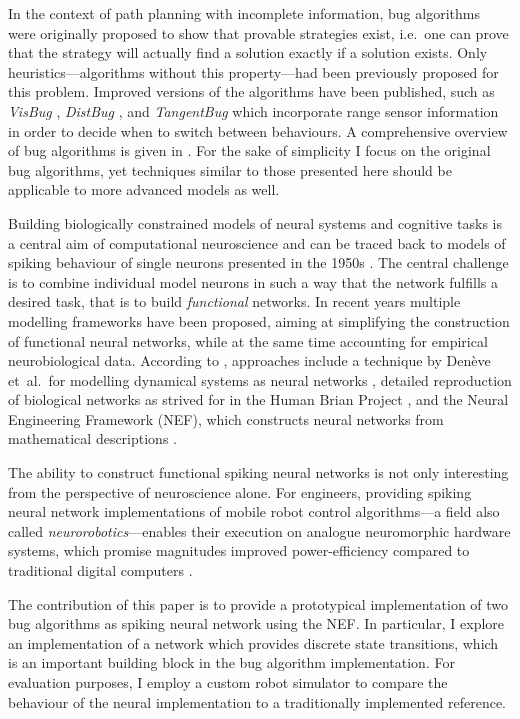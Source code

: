 \documentclass[letterpaper,10pt,conference]{ieeeconf}
\begin{document}
In the context of path planning with incomplete information, bug algorithms were originally proposed to show that provable strategies exist, i.e.~one can prove that the strategy will actually find a solution exactly if a solution exists. Only heuristics---algorithms without this property---had been previously proposed for this problem. Improved versions of the algorithms have been published, such as \emph{VisBug} \cite{lumelsky1990incorporating}, \emph{DistBug} \cite{kamon1997sensorybased}, and \emph{TangentBug} \cite{kamon1998tangentbug} which incorporate range sensor information in order to decide when to switch between behaviours. A comprehensive overview of bug algorithms is given in \cite{lavalle2006planning}. For the sake of simplicity I focus on the original bug algorithms, yet techniques similar to those presented here should be applicable to more advanced models as well.

Building biologically constrained models of neural systems and cognitive tasks is a central aim of computational neuroscience and can be traced back to models of spiking behaviour of single neurons presented in the 1950s \cite{hodgkin1952quantitative}. The central challenge is to combine individual model neurons in such a way that the network fulfills a desired task, that is to build \emph{functional} networks. In recent years multiple modelling frameworks have been proposed, aiming at simplifying the construction of functional neural networks, while at the same time accounting for empirical neurobiological data. According to \cite{komer2016unified}, approaches include a technique by Denève et~al.~for modelling dynamical systems as neural networks \cite{martin2013predictive}, detailed reproduction of biological networks as strived for in the Human Brian Project \cite{markram2012human}, and the Neural Engineering Framework (NEF), which constructs neural networks from mathematical descriptions \cite{eliasmith2003neural}.

The ability to construct functional spiking neural networks is not only interesting from the perspective of neuroscience alone. For engineers, providing spiking neural network implementations of mobile robot control algorithms---a field also called \emph{neurorobotics}---enables their execution on analogue neuromorphic hardware systems, which promise magnitudes improved power-efficiency compared to traditional digital computers \cite{boahen2017neuromorph}.

The contribution of this paper is to provide a prototypical implementation of two bug algorithms as spiking neural network using the NEF. In particular, I explore an implementation of a network which provides discrete state transitions, which is an important building block in the bug algorithm implementation. For evaluation purposes, I employ a custom robot simulator to compare the behaviour of the neural implementation to a traditionally implemented reference.
\end{document}
